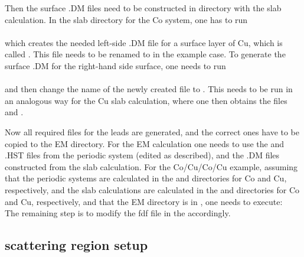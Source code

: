 \documentclass[11pt]{article}
\begin{document}
Then the surface .DM files need to be constructed in directory with the slab calculation. In the slab directory for the Co system, one has to run\\
\\
which creates the needed left-side .DM file for a surface layer of Cu, which is called . This file needs to be renamed to  in the example case. To generate the surface .DM for the right-hand side surface, one needs to run\\
\\
and then change the name of the newly created  file to . This needs to be run in an analogous way for the Cu slab calculation, where one then obtains the files  and .

Now all required files for the leads are generated, and the correct ones have to be copied to the EM directory. For the EM calculation one needs to use the  and .HST files from the periodic system (edited as described), and the .DM files constructed from the slab calculation. For the Co/Cu/Co/Cu example, assuming that the periodic systems are calculated in the  and  directories for Co and Cu, respectively, and the slab calculations are calculated in the  and  directories for Co and Cu, respectively, and that the EM directory is in , one needs to execute:\\
The remaining step is to modify the fdf file in the  accordingly.

\subsection{scattering region setup}
\end{document}
